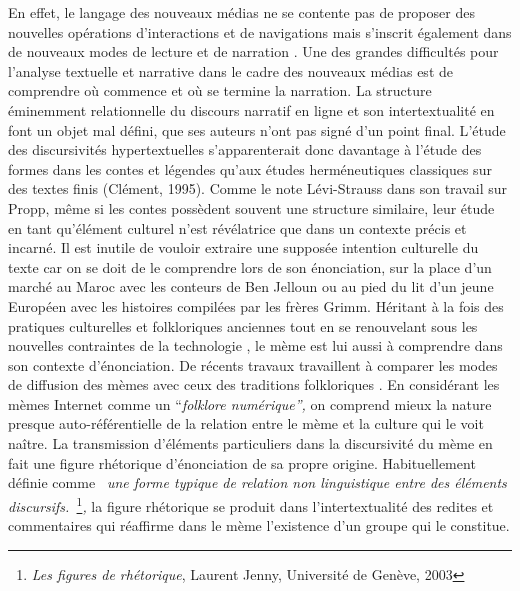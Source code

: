 En effet, le langage des nouveaux m\'edias ne se contente pas de proposer des nouvelles op\'erations d{\textquoteright}interactions et de navigations mais s{\textquoteright}inscrit \'egalement dans de nouveaux modes de lecture et de narration \citep{Manovich2001}. Une des grandes difficult\'es pour l{\textquoteright}analyse textuelle et narrative dans le cadre des nouveaux m\'edias est de comprendre o\`u commence et o\`u se termine la narration. La structure \'eminemment relationnelle du discours narratif en ligne et son intertextualit\'e en font un objet mal d\'efini, que ses auteurs n{\textquoteright}ont pas sign\'e d{\textquoteright}un point final. L{\textquoteright}\'etude des discursivit\'es hypertextuelles s{\textquoteright}apparenterait donc davantage \`a l{\textquoteright}\'etude des formes dans les contes et l\'egendes qu{\textquoteright}aux \'etudes herm\'eneutiques classiques sur des textes finis (Cl\'ement, 1995). Comme le note L\'evi-Strauss dans son travail sur Propp, m\^eme si les contes poss\`edent souvent une structure similaire, leur \'etude en tant qu{\textquoteright}\'el\'ement culturel n{\textquoteright}est r\'ev\'elatrice que dans un contexte pr\'ecis et incarn\'e. Il est inutile de vouloir extraire une suppos\'ee intention culturelle du texte car on se doit de le comprendre lors de son \'enonciation, sur la place d{\textquoteright}un march\'e au Maroc avec les conteurs de Ben Jelloun ou au pied du lit d{\textquoteright}un jeune Europ\'een avec les histoires compil\'ees par les fr\`eres Grimm. H\'eritant \`a la fois des pratiques culturelles et folkloriques anciennes tout en se renouvelant sous les nouvelles contraintes de la technologie \citep{Barber2008}, le m\`eme est lui aussi \`a comprendre dans son contexte d{\textquoteright}\'enonciation. De r\'ecents travaux travaillent \`a comparer les modes de diffusion des m\`emes avec ceux des traditions folkloriques \citep{De Seta2014}. En consid\'erant les m\`emes Internet comme un {\textquotedblleft}\textit{folklore num\'erique{\textquotedblright}, }on comprend mieux la nature presque auto-r\'ef\'erentielle de la relation entre le m\`eme et la culture qui le voit na\^itre. La transmission d{\textquoteright}\'el\'ements particuliers dans la discursivit\'e du m\`eme en fait une figure rh\'etorique d{\textquoteright}\'enonciation de sa propre origine. Habituellement d\'efinie comme \textit{{\guillemotleft}~une forme typique de relation non linguistique entre des \'el\'ements discursifs.~{\guillemotright}}\footnote{ \textit{Les figures de rh\'etorique}, Laurent Jenny, Universit\'e de Gen\`eve, 2003}\textit{, }la figure rh\'etorique se produit dans l{\textquoteright}intertextualit\'e des redites et commentaires qui r\'eaffirme dans le m\`eme l{\textquoteright}existence d{\textquoteright}un groupe qui le constitue.  

